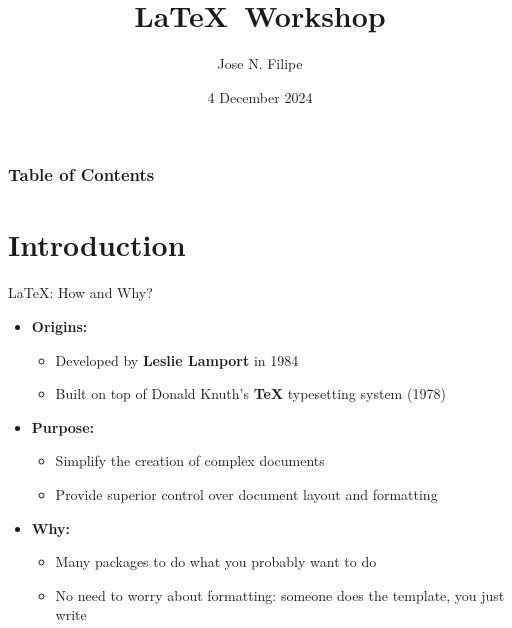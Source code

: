 \documentclass[aspectratio=169]{beamer}
\title{\LaTeX \ Workshop}
\author{Jose N. Filipe}
\date{4 December 2024}
\begin{document}
{
\begin{frame}
    \titlepage
\end{frame}
}

{
\begin{frame}
    \frametitle{Table of Contents}
    \tableofcontents
\end{frame}


}




\section{Introduction}

\begin{frame}{\LaTeX: How and Why?}
    \begin{itemize}
        \item \textbf{Origins:}
            \begin{itemize}
                \item Developed by \textbf{Leslie Lamport} in 1984
                \item Built on top of Donald Knuth's \textbf{TeX} typesetting system (1978)
            \end{itemize}
        \item \textbf{Purpose:}
            \begin{itemize}
                \item Simplify the creation of complex documents
                \item Provide superior control over document layout and formatting
            \end{itemize}
        \item \textbf{Why:}
            \begin{itemize}
                \item Many packages to do what you probably want to do
                \item No need to worry about formatting: someone does the template, you just write
            \end{itemize}
    \end{itemize}
\end{frame}
\end{document}
